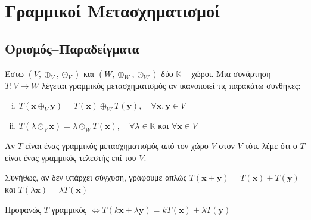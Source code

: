 



\let\vec\mathbf
\DeclareMathOperator{\im}{Im}
\DeclareMathOperator{\Null}{null}
\DeclareMathOperator{\n}{null}
\DeclareMathOperator{\R}{Rank}
\pagestyle{vangelis}




\chapter{Γραμμικοί Μετασχηματισμοί}

\section{Ορισμός--Παραδείγματα}


\begin{dfn}
  Έστω $ (V, \oplus _{V}, \odot _{V}) $ και $ (W, \oplus _{W}, \odot _{W}) $ δύο 
  $ \mathbb{K} - $χώροι. Μια συνάρτηση $ T \colon V \to W $ λέγεται 
  \textcolor{Col1}{γραμμικός μετασχηματισμός} αν ικανοποιεί τις παρακάτω συνθήκες:
  \begin{enumerate}[(i)]
    \item $ T(\mathbf{x} \oplus _{V} \mathbf{y}) = T(\mathbf{x}) \oplus _{W}
      T(\mathbf{y}), \quad \forall \mathbf{x}, \mathbf{y}  \in V $
    \item $ T(\lambda \odot _{V} \mathbf{x}) = \lambda \odot _{W} T(\mathbf{x}), 
      \quad \forall \lambda \in \mathbb{K} $ και $ \forall \mathbf{x} \in V $
  \end{enumerate}
  Αν $T$ είναι ένας γραμμικός μετασχηματισμός από τον χώρο $V$ στον $V$ τότε λέμε 
  ότι ο $T$ είναι ένας \textcolor{Col1}{γραμμικός τελεστής} επί του $V$. 
\end{dfn}

\begin{rem}
\item {}
  \begin{myitemize}
    \item Συνήθως, αν δεν υπάρχει σύγχυση, γράφουμε απλώς 
          $ T(\mathbf{x}+ \mathbf{y}) = T(\mathbf{x}) + T(\mathbf{y}) $ και 
          $ T(\lambda \mathbf{x}) = \lambda T(\mathbf{x}) $
    \item Προφανώς $T$ γραμμικός $ \Leftrightarrow  T(k \mathbf{x} + \lambda 
      \mathbf{y}) =k T(\mathbf{x}) + \lambda T(\mathbf{y}) $
  \end{myitemize}
\end{rem}

